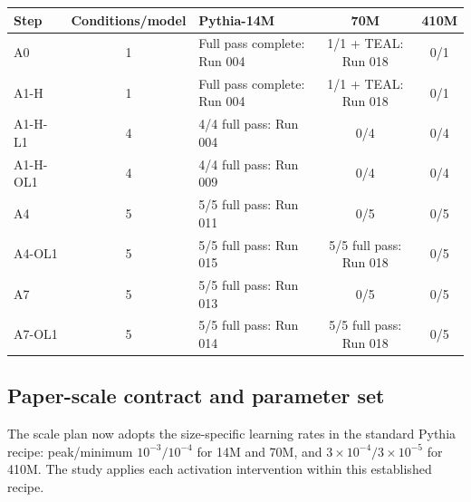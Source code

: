 \documentclass[10pt,a4paper]{article}
\begin{document}
{\small
\begin{center}
\begin{minipage}{\textwidth}
\label{tab:scope}
\begin{tabularx}{\textwidth}{@{}l c Y c c@{}}
\toprule
\textbf{Step} & \textbf{Conditions/model} & \textbf{Pythia-14M} & \textbf{70M} & \textbf{410M} \\
\midrule
A0 & 1 & Full pass complete: Run 004 & 1/1 + TEAL: Run 018 & 0/1 \\
A1-H & 1 & Full pass complete: Run 004 & 1/1 + TEAL: Run 018 & 0/1 \\
A1-H-L1 & 4 & 4/4 full pass: Run 004 & 0/4 & 0/4 \\
A1-H-OL1 & 4 & 4/4 full pass: Run 009 & 0/4 & 0/4 \\
A4 & 5 & 5/5 full pass: Run 011 & 0/5 & 0/5 \\
A4-OL1 & 5 & 5/5 full pass: Run 015 & 5/5 full pass: Run 018 & 0/5 \\
A7 & 5 & 5/5 full pass: Run 013 & 0/5 & 0/5 \\
A7-OL1 & 5 & 5/5 full pass: Run 014 & 5/5 full pass: Run 018 & 0/5 \\
\bottomrule
\end{tabularx}
\end{minipage}
\end{center}}

\subsection{Paper-scale contract and parameter set}

The scale plan now adopts the size-specific learning rates in the standard Pythia recipe: peak/minimum $10^{-3}/10^{-4}$ for 14M and 70M, and $3\times10^{-4}/3\times10^{-5}$ for 410M. The study applies each activation intervention within this established recipe.
\end{document}
